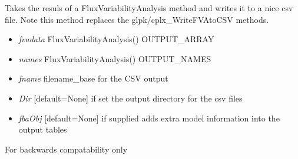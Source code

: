 \documentclass[a4paper,11pt,english]{sphinxmanual}
\begin{document}
\begin{fulllineitems}
\label{modules_doc:cbmpy.CBWrite.writeFVAtoCSV}
Takes the resuls of a FluxVariabilityAnalysis method and writes it to a nice
csv file. Note this method replaces the glpk/cplx\_WriteFVAtoCSV methods.
\begin{itemize}
\item {} 
\emph{fvadata} FluxVariabilityAnalysis() OUTPUT\_ARRAY

\item {} 
\emph{names} FluxVariabilityAnalysis() OUTPUT\_NAMES

\item {} 
\emph{fname} filename\_base for the CSV output

\item {} 
\emph{Dir} {[}default=None{]} if set the output directory for the csv files

\item {} 
\emph{fbaObj} {[}default=None{]} if supplied adds extra model information into the output tables

\end{itemize}

\end{fulllineitems}


\begin{fulllineitems}
\label{modules_doc:cbmpy.CBWrite.writeMinDistanceLPwithCost}
For backwards compatability only

\end{fulllineitems}

\end{document}
